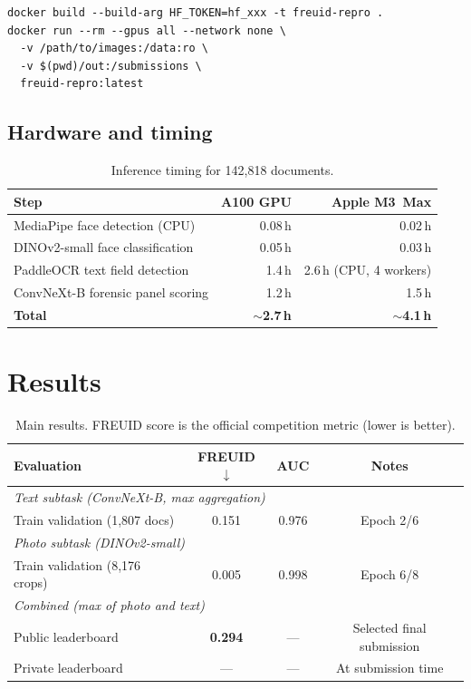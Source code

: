 \documentclass[11pt,a4paper]{article}
\begin{document}
\begin{verbatim}
docker build --build-arg HF_TOKEN=hf_xxx -t freuid-repro .
docker run --rm --gpus all --network none \
  -v /path/to/images:/data:ro \
  -v $(pwd)/out:/submissions \
  freuid-repro:latest
\end{verbatim}

\subsection{Hardware and timing}

\begin{table}[H]
  \centering
  \small
  \caption{Inference timing for 142{,}818 documents.}
  \label{tab:timing}
  \begin{tabular}{lrr}
    \toprule
    Step & A100 GPU & Apple M3~Max \\
    \midrule
    MediaPipe face detection (CPU)     & 0.08\,h & 0.02\,h \\
    DINOv2-small face classification   & 0.05\,h & 0.03\,h \\
    PaddleOCR text field detection     & 1.4\,h  & 2.6\,h (CPU, 4 workers) \\
    ConvNeXt-B forensic panel scoring  & 1.2\,h  & 1.5\,h \\
    \midrule
    \textbf{Total}                     & \textbf{$\sim$2.7\,h} & \textbf{$\sim$4.1\,h} \\
    \bottomrule
  \end{tabular}
\end{table}

\section{Results}
\label{sec:results}

\begin{table}[H]
  \centering
  \caption{Main results. FREUID score is the official competition metric
           (lower is better).}
  \label{tab:results_main}
  \begin{tabular}{lccc}
    \toprule
    Evaluation & FREUID $\downarrow$ & AUC & Notes \\
    \midrule
    \multicolumn{4}{l}{\textit{Text subtask (ConvNeXt-B, max aggregation)}} \\
    \quad Train validation (1{,}807 docs) & 0.151 & 0.976 & Epoch 2/6 \\
    \midrule
    \multicolumn{4}{l}{\textit{Photo subtask (DINOv2-small)}} \\
    \quad Train validation (8{,}176 crops) & 0.005 & 0.998 & Epoch 6/8 \\
    \midrule
    \multicolumn{4}{l}{\textit{Combined (max of photo and text)}} \\
    \quad Public leaderboard & \textbf{0.294} & --- & Selected final submission \\
    \quad Private leaderboard & --- & --- & At submission time \\
    \bottomrule
  \end{tabular}
\end{table}
\end{document}
